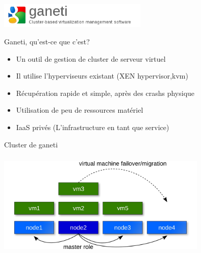

%

\begin{frame}
  \begin{center}
   \includegraphics[width=200pt]{images/logo_ganeti.png}
  \end{center}
\end{frame}

\begin{frame}{Ganeti, qu'est-ce que c'est?}
\begin{itemize}
\item Un outil de gestion de cluster de serveur virtuel
\pause
\item Il utilise l'hyperviseurs existant (XEN hypervisor,kvm)
\pause
\item Récupération rapide et simple, après des crashs physique
\pause
\item Utilisation de peu de ressources matériel
\pause
\item IaaS privés (L'infrastructure en tant que service)
\end{itemize}
\end{frame}

\begin{frame}{Cluster de ganeti}
\begin{center}
 \includegraphics[width=10cm,height=5cm]{images_presentation/ganeti_cluster.png}
\end{center}
\end{frame}


